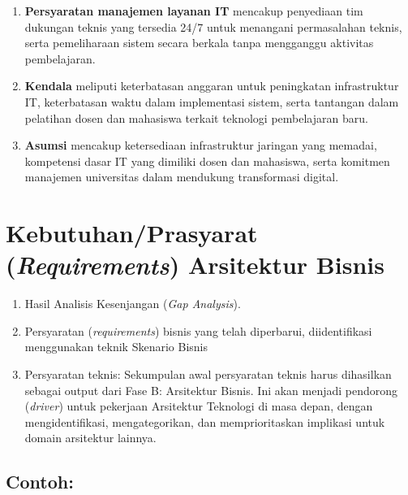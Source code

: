 \begin{enumerate}
	\item
	\textbf{Persyaratan manajemen layanan IT }mencakup penyediaan tim dukungan teknis yang tersedia 24/7 untuk menangani permasalahan teknis, serta pemeliharaan sistem secara berkala tanpa mengganggu aktivitas pembelajaran.
	
	\item
	\textbf{Kendala} meliputi keterbatasan anggaran untuk peningkatan infrastruktur IT, keterbatasan waktu dalam implementasi sistem, serta tantangan dalam pelatihan dosen dan mahasiswa terkait teknologi pembelajaran baru.
	
	\item
	\textbf{Asumsi} mencakup ketersediaan infrastruktur jaringan yang memadai, kompetensi dasar IT yang dimiliki dosen dan mahasiswa, serta komitmen manajemen universitas dalam mendukung transformasi digital.
	
\end{enumerate}

\section{Kebutuhan/Prasyarat (\textit{Requirements}) Arsitektur Bisnis}
\label{sec:spesifikasi_kebutuhan_arsitektur}

\begin{enumerate}
	\item Hasil Analisis Kesenjangan (\textit{Gap Analysis}).
	\item Persyaratan (\textit{requirements}) bisnis yang telah diperbarui, diidentifikasi menggunakan teknik Skenario Bisnis
	\item Persyaratan teknis: Sekumpulan awal persyaratan teknis harus dihasilkan sebagai output dari Fase B: Arsitektur Bisnis. Ini akan menjadi pendorong (\textit{driver}) untuk pekerjaan Arsitektur Teknologi di masa depan, dengan mengidentifikasi, mengategorikan, dan memprioritaskan implikasi untuk domain arsitektur lainnya.
\end{enumerate}

\subsection*{Contoh:}


